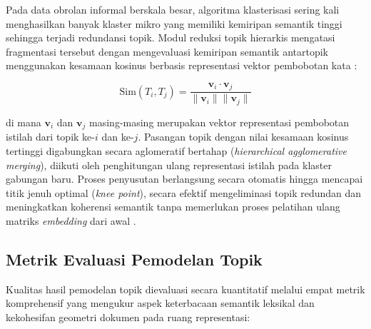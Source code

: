 Pada data obrolan informal berskala besar, algoritma klasterisasi sering kali menghasilkan banyak klaster mikro yang memiliki kemiripan semantik tinggi sehingga terjadi redundansi topik. Modul reduksi topik hierarkis mengatasi fragmentasi tersebut dengan mengevaluasi kemiripan semantik antartopik menggunakan kesamaan kosinus berbasis representasi vektor pembobotan kata \citep{grootendorst2022bertopic,11271424}:

\begin{equation}
	\text{Sim}(T_i, T_j) = \frac{\mathbf{v}_i \cdot \mathbf{v}_j}{\lVert \mathbf{v}_i \rVert \lVert \mathbf{v}_j \rVert}
\end{equation}

\noindent di mana $\mathbf{v}_i$ dan $\mathbf{v}_j$ masing-masing merupakan vektor representasi pembobotan istilah dari topik ke-$i$ dan ke-$j$. Pasangan topik dengan nilai kesamaan kosinus tertinggi digabungkan secara aglomeratif bertahap (\textit{hierarchical agglomerative merging}), diikuti oleh penghitungan ulang representasi istilah pada klaster gabungan baru. Proses penyusutan berlangsung secara otomatis hingga mencapai titik jenuh optimal (\textit{knee point}), secara efektif mengeliminasi topik redundan dan meningkatkan koherensi semantik tanpa memerlukan proses pelatihan ulang matriks \textit{embedding} dari awal \citep{11271424}.

\subsection{Metrik Evaluasi Pemodelan Topik}
\label{subsec:eval-metrics}

Kualitas hasil pemodelan topik dievaluasi secara kuantitatif melalui empat metrik komprehensif yang mengukur aspek keterbacaan semantik leksikal dan kekohesifan geometri dokumen pada ruang representasi:


